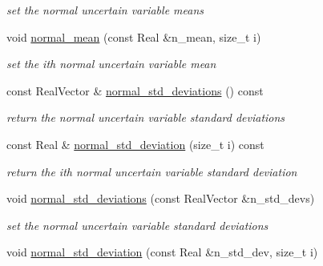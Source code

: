 \begin{DoxyCompactItemize}
\begin{DoxyCompactList}\small\item\em set the normal uncertain variable means \end{DoxyCompactList}\item 
void \hyperlink{classPecos_1_1AleatoryDistParams_ade2a699fc35d2b65015d30525830cd90}{normal\+\_\+mean} (const Real \&n\+\_\+mean, size\+\_\+t i)\label{classPecos_1_1AleatoryDistParams_ade2a699fc35d2b65015d30525830cd90}

\begin{DoxyCompactList}\small\item\em set the ith normal uncertain variable mean \end{DoxyCompactList}\item 
const Real\+Vector \& \hyperlink{classPecos_1_1AleatoryDistParams_ae4bd6299b9045884612e852116bd8407}{normal\+\_\+std\+\_\+deviations} () const \label{classPecos_1_1AleatoryDistParams_ae4bd6299b9045884612e852116bd8407}

\begin{DoxyCompactList}\small\item\em return the normal uncertain variable standard deviations \end{DoxyCompactList}\item 
const Real \& \hyperlink{classPecos_1_1AleatoryDistParams_ac8e0b82e00d279075dc53c1b6f25a793}{normal\+\_\+std\+\_\+deviation} (size\+\_\+t i) const \label{classPecos_1_1AleatoryDistParams_ac8e0b82e00d279075dc53c1b6f25a793}

\begin{DoxyCompactList}\small\item\em return the ith normal uncertain variable standard deviation \end{DoxyCompactList}\item 
void \hyperlink{classPecos_1_1AleatoryDistParams_a9e7e51dadee83263eadc216ca62c8205}{normal\+\_\+std\+\_\+deviations} (const Real\+Vector \&n\+\_\+std\+\_\+devs)\label{classPecos_1_1AleatoryDistParams_a9e7e51dadee83263eadc216ca62c8205}

\begin{DoxyCompactList}\small\item\em set the normal uncertain variable standard deviations \end{DoxyCompactList}\item 
void \hyperlink{classPecos_1_1AleatoryDistParams_aadc91fa74e70d7a04bf2eaaf91399499}{normal\+\_\+std\+\_\+deviation} (const Real \&n\+\_\+std\+\_\+dev, size\+\_\+t i)\label{classPecos_1_1AleatoryDistParams_aadc91fa74e70d7a04bf2eaaf91399499}


\end{DoxyCompactItemize}
